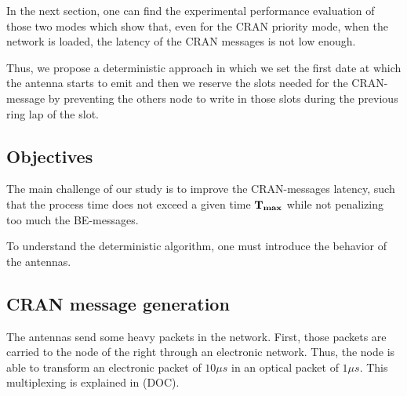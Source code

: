 \documentclass[a4paper,10pt]{article}
\begin{document}
 In the next section, one can find the experimental performance evaluation of those two modes which show that, even for the CRAN priority mode, when the network is loaded, the latency of the CRAN messages is not low enough.
 
 Thus, we propose a deterministic approach in which we set the first date at which the antenna starts to emit and then we reserve the slots needed for the CRAN-message by preventing the others node to write in those slots during the previous ring lap of the slot. 
 

  \subsection{Objectives}
    The main challenge of our study is to improve the CRAN-messages latency, such that the process time does not exceed a given time ${\bf T_{max}} $ while not penalizing too much the BE-messages.
    
    To understand the deterministic algorithm, one must introduce the behavior of the antennas.
    \subsection{CRAN message generation}
    The antennas send some heavy packets in the network. First, those packets are carried to the node of the right through an electronic network. Thus, the node is able to transform an electronic packet of $10\mu s$ in an optical packet of $1\mu s$. This multiplexing is explained in (DOC).
    
\end{document}
